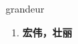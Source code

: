 
\begin{frame}
{\huge grandeur}
\begin{center}
\begin{enumerate}\Large
  \item \textbf{宏伟，壮丽}
\end{enumerate}
\end{center}
\end{frame}
